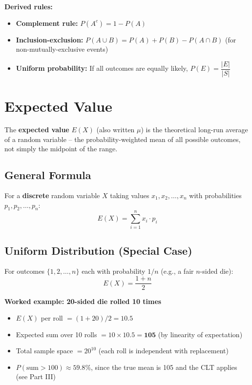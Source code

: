 \documentclass[11pt, letterpaper]{article}
\begin{document}
\textbf{Derived rules:}
\begin{itemize}[noitemsep]
  \item \textbf{Complement rule:} $P(A^c) = 1 - P(A)$
  \item \textbf{Inclusion-exclusion:} $P(A \cup B) = P(A) + P(B) - P(A \cap B)$ \quad (for non-mutually-exclusive events)
  \item \textbf{Uniform probability:} If all outcomes are equally likely, $P(E) = \dfrac{|E|}{|S|}$
\end{itemize}

\section*{Expected Value}

The \textbf{expected value} $E(X)$ (also written $\mu$) is the theoretical long-run average of a random variable -- the probability-weighted mean of all possible outcomes, not simply the midpoint of the range.

\subsection*{General Formula}
For a \textbf{discrete} random variable $X$ taking values $x_1, x_2, \ldots, x_n$ with probabilities $p_1, p_2, \ldots, p_n$:
\[
  E(X) = \sum_{i=1}^{n} x_i \cdot p_i
\]

\subsection*{Uniform Distribution (Special Case)}
For outcomes $\{1, 2, \ldots, n\}$ each with probability $1/n$ (e.g., a fair $n$-sided die):
\[
  E(X) = \frac{1 + n}{2}
\]

\begin{tcolorbox}[colback=part3bg, colframe=sectionpurple, arc=3pt, boxrule=1pt]
\textbf{Worked example: 20-sided die rolled 10 times}
\begin{itemize}[noitemsep, leftmargin=*]
  \item $E(X)$ per roll $= (1 + 20)/2 = 10.5$
  \item Expected sum over 10 rolls $= 10 \times 10.5 = \mathbf{105}$ \quad (by linearity of expectation)
  \item Total sample space $= 20^{10}$ (each roll is independent with replacement)
  \item $P(\text{sum} > 100) \approx 59.8\%$, since the true mean is 105 and the CLT applies (see Part III)
\end{itemize}
\end{tcolorbox}
\end{document}
